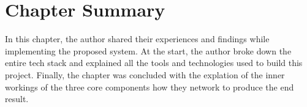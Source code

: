 \section{Chapter Summary}

In this chapter, the author shared their experiences and findings while implementing the proposed system. At the start, the author broke down the entire tech stack and explained all the tools and technologies used to build this project. Finally, the chapter was concluded with the explation of the inner workings of the three core components how they network to produce the end result.